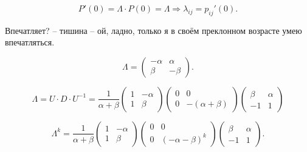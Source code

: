 \begin{corollary}
  \[
    P'(0) = \Lambda \cdot P(0) = \Lambda
    \Rightarrow
    \lambda_{ij} = p_{ij}' (0).
  \]
\end{corollary}

Впечатляет? -- тишина -- ой, ладно, только я в своём преклонном возрасте умею впечатляться.

\begin{ex}
  \[
    \Lambda = \begin{pmatrix}
      -\alpha & \alpha \\
      \beta & -\beta
    \end{pmatrix}.
  \]

  \[
    \Lambda = U \cdot D \cdot U^{-1}
    = \dfrac{1}{\alpha+\beta} \begin{pmatrix}
      1 & -\alpha \\
      1 & \beta
    \end{pmatrix}  \begin{pmatrix}
      0 & 0 \\
      0 & - (\alpha+\beta)
    \end{pmatrix} \begin{pmatrix}
      \beta & \alpha \\
      -1 & 1
    \end{pmatrix} 
  \]

  \[
    \Lambda^k = \dfrac{1}{\alpha+\beta} \begin{pmatrix}
      1 & -\alpha \\
      1 & \beta
    \end{pmatrix} \begin{pmatrix}
      0 & 0 \\
      0 & (-\alpha-\beta)^k
    \end{pmatrix} \begin{pmatrix}
      \beta & \alpha \\
      -1 & 1
    \end{pmatrix}.
  \]


\end{ex}
